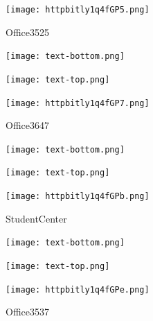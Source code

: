 \documentclass[letterpaper]{article}
\begin{document}
 \begingroup 
 \centerline{\texttt{[image: httpbitly1q4fGP5.png]}} 
 \endgroup 
 \vspace*{\fill} 

 \hfill{\small Office3525} 

  \vspace{0.7in} 
 
 \centerline{\texttt{[image: text-bottom.png]}} 
 
 \pagebreak 
{} 
 \vspace*{\fill} 
 
  \centerline{\texttt{[image: text-top.png]}} 
 
 \vspace{0.5in} 
 
 \begingroup 
 \centerline{\texttt{[image: httpbitly1q4fGP7.png]}} 
 \endgroup 
 \vspace*{\fill} 

 \hfill{\small Office3647} 

  \vspace{0.7in} 
 
 \centerline{\texttt{[image: text-bottom.png]}} 
 
 \pagebreak 
{} 
 \vspace*{\fill} 
 
  \centerline{\texttt{[image: text-top.png]}} 
 
 \vspace{0.5in} 
 
 \begingroup 
 \centerline{\texttt{[image: httpbitly1q4fGPb.png]}} 
 \endgroup 
 \vspace*{\fill} 

 \hfill{\small StudentCenter} 

  \vspace{0.7in} 
 
 \centerline{\texttt{[image: text-bottom.png]}} 
 
 \pagebreak 
{} 
 \vspace*{\fill} 
 
  \centerline{\texttt{[image: text-top.png]}} 
 
 \vspace{0.5in} 
 
 \begingroup 
 \centerline{\texttt{[image: httpbitly1q4fGPe.png]}} 
 \endgroup 
 \vspace*{\fill} 

 \hfill{\small Office3537} 

  \vspace{0.7in} 
 
\end{document}
